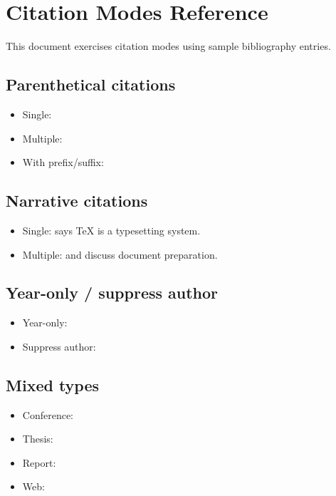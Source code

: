 \documentclass{article}
\begin{document}
\section*{Citation Modes Reference}
This document exercises citation modes using sample bibliography entries.

\subsection*{Parenthetical citations}
\begin{itemize}
  \item Single: \parencite{knuth1984}
  \item Multiple: \parencite{knuth1984,lamport1994}
  \item With prefix/suffix: \parencite[see][p.~42]{knuth1984}
\end{itemize}

\subsection*{Narrative citations}
\begin{itemize}
  \item Single: \textcite{knuth1984} says TeX is a typesetting system.
  \item Multiple: \textcite{knuth1984} and \textcite{lamport1994} discuss document preparation.
\end{itemize}

\subsection*{Year-only / suppress author}
\begin{itemize}
  \item Year-only: \cite*{knuth1984}
  \item Suppress author: \parencite*{knuth1984}
\end{itemize}

\subsection*{Mixed types}
\begin{itemize}
  \item Conference: \parencite{miller2023}
  \item Thesis: \parencite{garcia2022}
  \item Report: \parencite{lee2021}
  \item Web: \parencite{webaccess2024}
\end{itemize}
\end{document}
